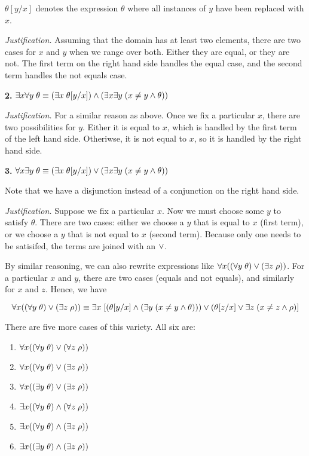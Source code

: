 \documentclass{article}
\begin{document}
$\theta[y/x]$ denotes the expression $\theta$ where all instances of $y$ have
been replaced with $x$.

\textit{Justification.} Assuming that the domain has at least two elements,
there are two cases for $x$ and $y$ when we range over both. Either they are
equal, or they are not. The first term on the right hand side handles the equal
case, and the second term handles the not equals case.


\bigskip
\textbf{2. }{\boldmath $\exists x \forall y \; \theta \equiv (\exists x \; \theta[y/x]) \wedge (\exists x \exists y \; (x \neq y \wedge \theta))$}
\smallskip

\textit{Justification.} For a similar reason as above. Once we fix a particular
$x$, there are two possibilities for $y$. Either it is equal to $x$, which is
handled by the first term of the left hand side. Otheriwse, it is not equal to
$x$, so it is handled by the right hand side.


\bigskip
\textbf{3. }{\boldmath $\forall x \exists y \; \theta \equiv (\exists x \; \theta[y/x]) \vee (\exists x \exists y \; (x \neq y \wedge \theta))$}
\smallskip

Note that we have a disjunction instead of a conjunction on the right hand
side.

\textit{Justification.} Suppose we fix a particular $x$. Now we must choose
some $y$ to satisfy $\theta$. There are two cases: either we choose a $y$ that
is equal to $x$ (first term), or we choose a $y$ that is not equal to $x$
(second term). Because only one needs to be satisifed, the terms are joined
with an $\vee$.

By similar reasoning, we can also rewrite expressions like $\forall x ((\forall
y \; \theta) \vee (\exists z \; \rho))$. For a particular $x$ and $y$, there are
two cases (equals and not equals), and similarly for $x$ and $z$. Hence, we
have


$$
\forall x ((\forall y \; \theta) \vee (\exists z \; \rho)) \equiv \exists x \; [(\theta[y/x] \wedge (\exists y \; (x \neq y \wedge \theta))) \vee (\theta[z/x] \vee \exists z \; (x \neq z \wedge \rho)]
$$

There are five more cases of this variety. All six are:

\begin{enumerate}[label = {\roman*)}, itemsep=0mm]
    \item $\forall x ((\forall y \; \theta) \vee (\forall z \; \rho))$
    \item $\forall x ((\forall y \; \theta) \vee (\exists z \; \rho))$
    \item $\forall x ((\exists y \; \theta) \vee (\exists z \; \rho))$
    \item $\exists x ((\forall y \; \theta) \wedge (\forall z \; \rho))$
    \item $\exists x ((\forall y \; \theta) \wedge (\exists z \; \rho))$
    \item $\exists x ((\exists y \; \theta) \wedge (\exists z \; \rho))$
\end{enumerate}
\end{document}

